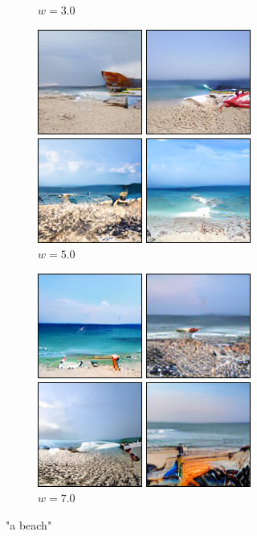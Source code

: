 \documentclass[11pt,a4paper]{article}
\begin{document}
\begin{figure}[!ht]
\begin{subfigure}[b]{0.24\textwidth}
    \caption{$w=3.0$}
    \end{subfigure}
    \begin{subfigure}[b]{0.24\textwidth}
    \includegraphics[width=\linewidth]{figures/a_beach_5.png}
    \caption{$w=5.0$}
    \end{subfigure}
    \begin{subfigure}[b]{0.24\textwidth}
    \includegraphics[width=\linewidth]{figures/a_beach_7.png}
    \caption{$w=7.0$}
    \end{subfigure}
    \caption{"a beach"}
    \end{figure}
\end{document}
